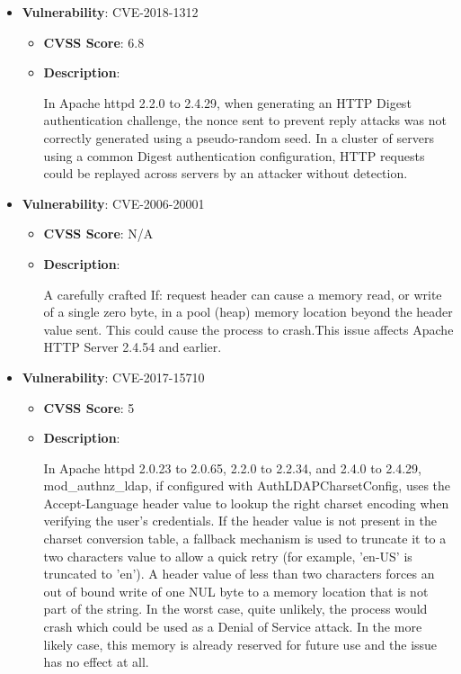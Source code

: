 \documentclass{article}
\begin{document}
\begin{itemize}
        \item \textbf{Vulnerability}: CVE-2018-1312
        \begin{itemize}
            \item \textbf{CVSS Score}:  6.8 
            \item \textbf{Description}:
            \parbox[t]{0.9\linewidth}{
                \ttfamily In Apache httpd 2.2.0 to 2.4.29, when generating an HTTP Digest authentication challenge, the nonce sent to prevent reply attacks was not correctly generated using a pseudo-random seed. In a cluster of servers using a common Digest authentication configuration, HTTP requests could be replayed across servers by an attacker without detection.
            }
        \end{itemize}
    
        \item \textbf{Vulnerability}: CVE-2006-20001
        \begin{itemize}
            \item \textbf{CVSS Score}:  N/A 
            \item \textbf{Description}:
            \parbox[t]{0.9\linewidth}{
                \ttfamily A carefully crafted If: request header can cause a memory read, or write of a single zero byte, in a pool (heap) memory location beyond the header value sent. This could cause the process to crash.This issue affects Apache HTTP Server 2.4.54 and earlier.
            }
        \end{itemize}
    
        \item \textbf{Vulnerability}: CVE-2017-15710
        \begin{itemize}
            \item \textbf{CVSS Score}:  5 
            \item \textbf{Description}:
            \parbox[t]{0.9\linewidth}{
                \ttfamily In Apache httpd 2.0.23 to 2.0.65, 2.2.0 to 2.2.34, and 2.4.0 to 2.4.29, mod\_authnz\_ldap, if configured with AuthLDAPCharsetConfig, uses the Accept-Language header value to lookup the right charset encoding when verifying the user's credentials. If the header value is not present in the charset conversion table, a fallback mechanism is used to truncate it to a two characters value to allow a quick retry (for example, 'en-US' is truncated to 'en'). A header value of less than two characters forces an out of bound write of one NUL byte to a memory location that is not part of the string. In the worst case, quite unlikely, the process would crash which could be used as a Denial of Service attack. In the more likely case, this memory is already reserved for future use and the issue has no effect at all.
            }
        \end{itemize}
    

\end{itemize}
\end{document}

